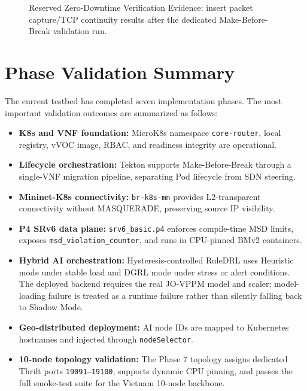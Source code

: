 \documentclass[12pt, a4paper, reqno, oneside]{book}
\begin{document}
\begin{figure}[H]
    \centering
    \vspace{6cm}
    \caption{Reserved Zero-Downtime Verification Evidence: insert packet capture/TCP continuity results after the dedicated Make-Before-Break validation run.}
    \label{fig:zero_downtime_proof}
\end{figure}

\section{Phase Validation Summary}
The current testbed has completed seven implementation phases. The most important validation outcomes are summarized as follows:
\begin{itemize}
    \item \textbf{K8s and VNF foundation:} MicroK8s namespace \texttt{core-router}, local registry, vVOC image, RBAC, and readiness integrity are operational.
    \item \textbf{Lifecycle orchestration:} Tekton supports Make-Before-Break through a single-VNF migration pipeline, separating Pod lifecycle from SDN steering.
    \item \textbf{Mininet-K8s connectivity:} \texttt{br-k8s-mn} provides L2-transparent connectivity without MASQUERADE, preserving source IP visibility.
    \item \textbf{P4 SRv6 data plane:} \texttt{srv6\_basic.p4} enforces compile-time MSD limits, exposes \texttt{msd\_violation\_counter}, and runs in CPU-pinned BMv2 containers.
    \item \textbf{Hybrid AI orchestration:} Hysteresis-controlled RuleDRL uses Heuristic mode under stable load and DGRL mode under stress or alert conditions. The deployed backend requires the real JO-VPPM model and scaler; model-loading failure is treated as a runtime failure rather than silently falling back to Shadow Mode.
    \item \textbf{Geo-distributed deployment:} AI node IDs are mapped to Kubernetes hostnames and injected through \texttt{nodeSelector}.
    \item \textbf{10-node topology validation:} The Phase 7 topology assigns dedicated Thrift ports \texttt{19091--19100}, supports dynamic CPU pinning, and passes the full smoke-test suite for the Vietnam 10-node backbone.
\end{itemize}
\end{document}
